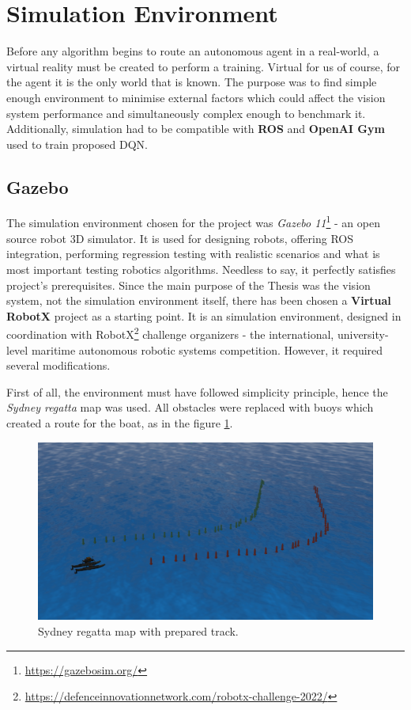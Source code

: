 \section{Simulation Environment}
\label{sec:simulation-env}

Before any algorithm begins to route an autonomous agent in a real-world, a virtual reality must be created to perform a
training. Virtual for us of course, for the agent it is the only world that is known. The purpose was to find simple enough
environment to minimise external factors which could affect the vision system performance and simultaneously complex enough to
benchmark it. Additionally, simulation had to be compatible with
\textbf{ROS} and \textbf{OpenAI Gym} used to train proposed DQN.

\subsection{Gazebo}
\label{sub:gazebo}

The simulation environment chosen for the project was \emph{Gazebo 11}\footnote{\url{https://gazebosim.org/}} - an open source robot 3D simulator.
It is used for designing robots, offering ROS integration, performing regression testing with realistic scenarios and what is most important testing robotics algorithms. Needless to say, it perfectly satisfies project's prerequisites. Since the main purpose of the Thesis was the vision system, not the simulation environment itself, there has been chosen a \textbf{Virtual RobotX} \cite{bingham19toward} project as a starting point. It is an simulation environment, designed in coordination with RobotX\footnote{\url{https://defenceinnovationnetwork.com/robotx-challenge-2022/}} challenge organizers - the international, university-level maritime autonomous robotic systems competition. However, it required several modifications.

First of all, the environment must have followed simplicity principle, hence the \emph{Sydney regatta} map was used. All obstacles were replaced with buoys which created a route for the boat, as in the figure \ref{fig:sydney-regatta-map}. 

\begin{figure}[h]
    \centering
    \includegraphics[width=16cm]{img/simulation_view.png}
    \caption{Sydney regatta map with prepared track.}
    \label{fig:sydney-regatta-map}
\end{figure}

